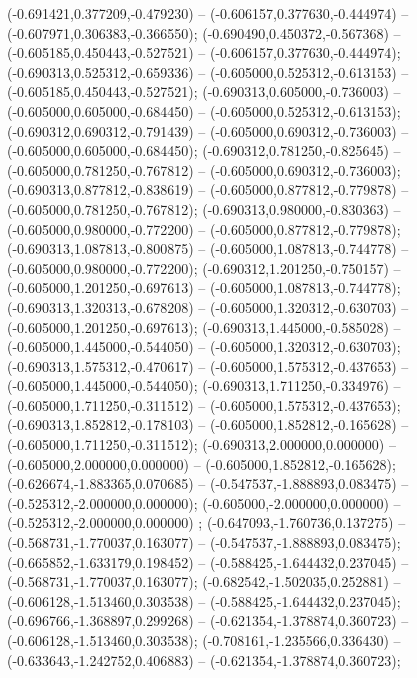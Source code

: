  (-0.691421,0.377209,-0.479230) -- (-0.606157,0.377630,-0.444974) -- (-0.607971,0.306383,-0.366550);
 (-0.690490,0.450372,-0.567368) -- (-0.605185,0.450443,-0.527521) -- (-0.606157,0.377630,-0.444974);
 (-0.690313,0.525312,-0.659336) -- (-0.605000,0.525312,-0.613153) -- (-0.605185,0.450443,-0.527521);
 (-0.690313,0.605000,-0.736003) -- (-0.605000,0.605000,-0.684450) -- (-0.605000,0.525312,-0.613153);
 (-0.690312,0.690312,-0.791439) -- (-0.605000,0.690312,-0.736003) -- (-0.605000,0.605000,-0.684450);
 (-0.690312,0.781250,-0.825645) -- (-0.605000,0.781250,-0.767812) -- (-0.605000,0.690312,-0.736003);
 (-0.690313,0.877812,-0.838619) -- (-0.605000,0.877812,-0.779878) -- (-0.605000,0.781250,-0.767812);
 (-0.690313,0.980000,-0.830363) -- (-0.605000,0.980000,-0.772200) -- (-0.605000,0.877812,-0.779878);
 (-0.690313,1.087813,-0.800875) -- (-0.605000,1.087813,-0.744778) -- (-0.605000,0.980000,-0.772200);
 (-0.690312,1.201250,-0.750157) -- (-0.605000,1.201250,-0.697613) -- (-0.605000,1.087813,-0.744778);
 (-0.690313,1.320313,-0.678208) -- (-0.605000,1.320312,-0.630703) -- (-0.605000,1.201250,-0.697613);
 (-0.690313,1.445000,-0.585028) -- (-0.605000,1.445000,-0.544050) -- (-0.605000,1.320312,-0.630703);
 (-0.690313,1.575312,-0.470617) -- (-0.605000,1.575312,-0.437653) -- (-0.605000,1.445000,-0.544050);
 (-0.690313,1.711250,-0.334976) -- (-0.605000,1.711250,-0.311512) -- (-0.605000,1.575312,-0.437653);
 (-0.690313,1.852812,-0.178103) -- (-0.605000,1.852812,-0.165628) -- (-0.605000,1.711250,-0.311512);
 (-0.690313,2.000000,0.000000) -- (-0.605000,2.000000,0.000000) -- (-0.605000,1.852812,-0.165628);
 (-0.626674,-1.883365,0.070685) -- (-0.547537,-1.888893,0.083475) -- (-0.525312,-2.000000,0.000000);
 (-0.605000,-2.000000,0.000000) -- (-0.525312,-2.000000,0.000000) ;
 (-0.647093,-1.760736,0.137275) -- (-0.568731,-1.770037,0.163077) -- (-0.547537,-1.888893,0.083475);
 (-0.665852,-1.633179,0.198452) -- (-0.588425,-1.644432,0.237045) -- (-0.568731,-1.770037,0.163077);
 (-0.682542,-1.502035,0.252881) -- (-0.606128,-1.513460,0.303538) -- (-0.588425,-1.644432,0.237045);
 (-0.696766,-1.368897,0.299268) -- (-0.621354,-1.378874,0.360723) -- (-0.606128,-1.513460,0.303538);
 (-0.708161,-1.235566,0.336430) -- (-0.633643,-1.242752,0.406883) -- (-0.621354,-1.378874,0.360723);
